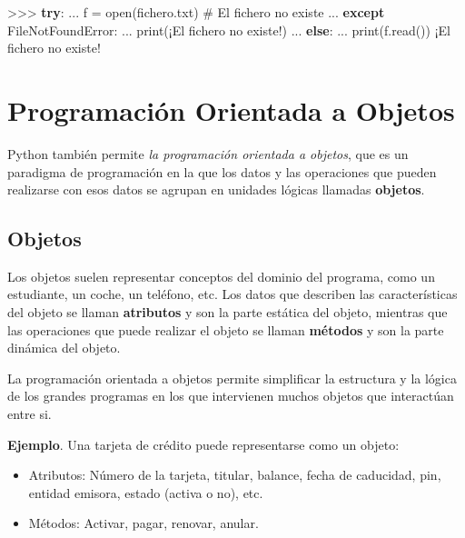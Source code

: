 \documentclass[
  spanish,
  a4paper,
]{scrreport}
\newenvironment{Shaded}{\begin{snugshade}}{\end{snugshade}}
\newcommand{\BuiltInTok}[1]{\textcolor[rgb]{0.00,0.23,0.31}{#1}}
\newcommand{\CommentTok}[1]{\textcolor[rgb]{0.37,0.37,0.37}{#1}}
\newcommand{\ControlFlowTok}[1]{\textcolor[rgb]{0.00,0.23,0.31}{\textbf{#1}}}
\newcommand{\NormalTok}[1]{\textcolor[rgb]{0.00,0.23,0.31}{#1}}
\newcommand{\OperatorTok}[1]{\textcolor[rgb]{0.37,0.37,0.37}{#1}}
\newcommand{\PreprocessorTok}[1]{\textcolor[rgb]{0.68,0.00,0.00}{#1}}
\newcommand{\StringTok}[1]{\textcolor[rgb]{0.13,0.47,0.30}{#1}}
\providecommand{\tightlist}{%
  \setlength{\itemsep}{0pt}\setlength{\parskip}{0pt}}
\begin{document}
\begin{Shaded}
\begin{Highlighting}[]
\OperatorTok{\textgreater{}\textgreater{}\textgreater{}} \ControlFlowTok{try}\NormalTok{:}
\NormalTok{...     f }\OperatorTok{=} \BuiltInTok{open}\NormalTok{(}\StringTok{\textquotesingle{}fichero.txt\textquotesingle{}}\NormalTok{)  }\CommentTok{\# El fichero no existe}
\NormalTok{... }\ControlFlowTok{except} \PreprocessorTok{FileNotFoundError}\NormalTok{:}
\NormalTok{...     }\BuiltInTok{print}\NormalTok{(}\StringTok{\textquotesingle{}¡El fichero no existe!\textquotesingle{}}\NormalTok{)}
\NormalTok{... }\ControlFlowTok{else}\NormalTok{:}
\NormalTok{...     }\BuiltInTok{print}\NormalTok{(f.read())}
\NormalTok{¡El fichero no existe}\OperatorTok{!}
\end{Highlighting}
\end{Shaded}


\chapter{Programación Orientada a
Objetos}\label{programaciuxf3n-orientada-a-objetos}

Python también permite \emph{la programación orientada a objetos}, que
es un paradigma de programación en la que los datos y las operaciones
que pueden realizarse con esos datos se agrupan en unidades lógicas
llamadas \textbf{objetos}.

\section{Objetos}\label{objetos}

Los objetos suelen representar conceptos del dominio del programa, como
un estudiante, un coche, un teléfono, etc. Los datos que describen las
características del objeto se llaman \textbf{atributos} y son la parte
estática del objeto, mientras que las operaciones que puede realizar el
objeto se llaman \textbf{métodos} y son la parte dinámica del objeto.

La programación orientada a objetos permite simplificar la estructura y
la lógica de los grandes programas en los que intervienen muchos objetos
que interactúan entre si.

\textbf{Ejemplo}. Una tarjeta de crédito puede representarse como un
objeto:

\begin{itemize}
\tightlist
\item
  Atributos: Número de la tarjeta, titular, balance, fecha de caducidad,
  pin, entidad emisora, estado (activa o no), etc.
\item
  Métodos: Activar, pagar, renovar, anular.
\end{itemize}
\end{document}
